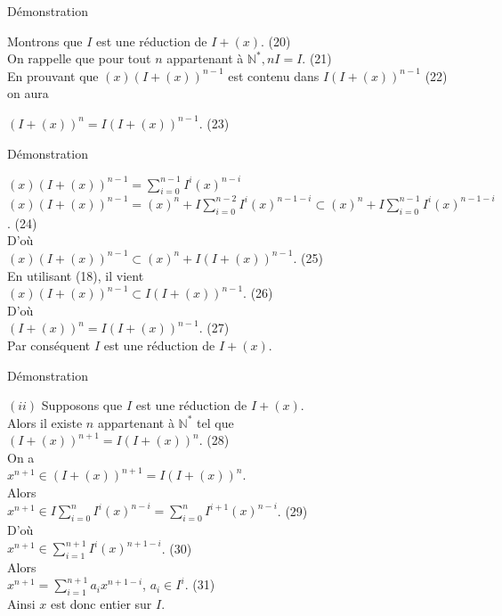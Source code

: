 \documentclass[11pt,a4paper]{beamer}
\begin{document}
	
			\begin{frame}{Démonstration}
		\begin{block}{}
			Montrons que $I$ est une réduction de $I + (x)$. (20)\\ On rappelle que pour tout $n $ appartenant à $ \mathbb{N}^*, nI = I.$ (21)\\
			En prouvant que $(x)(I+(x))^{n-1} $ est contenu dans $ I(I+(x))^{n-1}$ (22) on aura
			\begin{center}
				$(I+(x))^n = I(I+(x))^{n-1}$. (23)
			\end{center}
		\end{block}
	\end{frame}
	\begin{frame}{Démonstration}
		\begin{block}{}
			$(x)(I+(x))^{n-1} = \displaystyle \sum_{i=0}^{n-1}{I^i (x)^{n-i}}$ \\
			$(x)(I+(x))^{n-1} = (x)^n + I\displaystyle \sum_{i=0}^{n-2}{I^i (x)^{n-1-i}} \subset (x)^n + \displaystyle I\sum_{i=0}^{n-1}{I^i (x)^{n-1-i}}$. (24)\\
			D'où \\$(x)(I+(x))^{n-1} \subset (x)^n + I(I+(x))^{n-1}.$ (25)\\
			En utilisant (18), il vient
			\\$(x)(I+(x))^{n-1} \subset I(I+(x))^{n-1}.$ (26) \\ D'où \\$ (I+(x))^{n} = I(I+(x))^{n-1}$. (27)\\
			Par conséquent $I$ est une réduction de $I + (x)$.
		\end{block}
	\end{frame}
	
	
					\begin{frame}{Démonstration}
		\begin{block}{}
				$(ii)$ Supposons que $I$ est une réduction de $I + (x)$.\\
			Alors il existe $ n $ appartenant à $ \mathbb{N^*}$ tel que \\ $(I + (x))^{n+1} = I(I + (x))^{n}$. (28)\\
			On a \\ $x^{n+1} \in (I + (x))^{n+1} = I(I + (x))^{n}$. \\Alors \\ $x^{n+1} \in I\displaystyle \sum_{i=0}^{n}{I^i (x)^{n-i}} = \displaystyle \sum_{i=0}^{n}{I^{i+1} (x)^{n-i}}$. (29)\\
			D'où \\$x^{n+1} \in \displaystyle \sum_{i=1}^{n+1}{I^i (x)^{n+1-i}}$. (30)\\ Alors \\$ x^{n+1} =  \displaystyle \sum_{i=1}^{n+1}{a_i x^{n+1-i}}$,  $a_i \in I^i$. (31)\\ Ainsi $x$ est donc entier sur $I$.
		\end{block}
	\end{frame}
	
\end{document}
